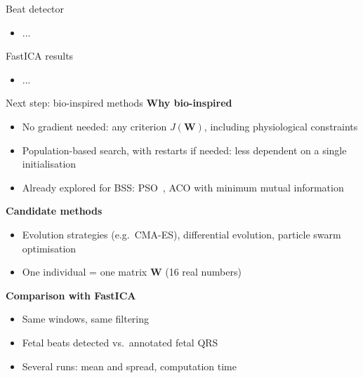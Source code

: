 \documentclass{beamer}
\begin{document}
\begin{frame}{Beat detector}
  \begin{itemize}
    \item ...
  \end{itemize}
\end{frame}

\begin{frame}{FastICA results}
  \begin{itemize}
    \item ...
  \end{itemize}
\end{frame}

\begin{frame}{Next step: bio-inspired methods}
  \small
  \textbf{Why bio-inspired}
  \begin{itemize}
    \item No gradient needed: any criterion $J(\mathbf{W})$, including physiological constraints
    \item Population-based search, with restarts if needed: less dependent on a single initialisation
    \item Already explored for BSS: PSO~\cite{kimoto2011}, ACO with minimum mutual information~\cite{zhang2009}
  \end{itemize}
  \vspace{0.5em}
  \textbf{Candidate methods}
  \begin{itemize}
    \item Evolution strategies (e.g.\ CMA-ES), differential evolution, particle swarm optimisation
    \item One individual = one matrix $\mathbf{W}$ (16 real numbers)
  \end{itemize}
  \vspace{0.5em}
  \textbf{Comparison with FastICA}
  \begin{itemize}
    \item Same windows, same filtering
    \item Fetal beats detected vs.\ annotated fetal QRS
    \item Several runs: mean and spread, computation time
  \end{itemize}
\end{frame}
\end{document}
